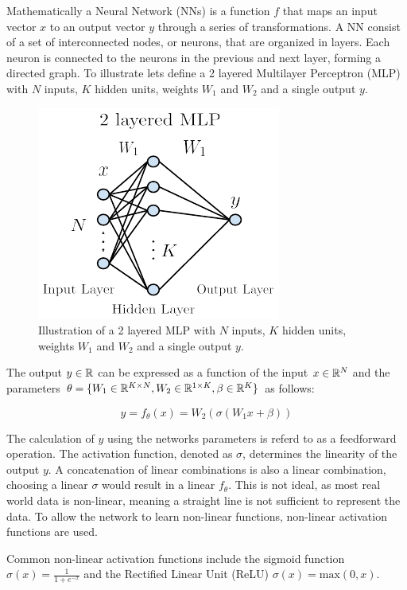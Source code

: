 Mathematically a Neural Network (NNs) is a function $f$ that maps an input vector $x$ to an output vector $y$ through a series of transformations. 
A NN consist of a set of interconnected nodes, or neurons, that are organized in layers. Each neuron is connected to the neurons in the previous and next layer, forming a directed graph.
To illustrate lets define a 2 layered Multilayer Perceptron (MLP) with $N$ inputs, $K$ hidden units, weights $W_1$ and $W_2$ and a single output $y$. 
\begin{figure}[H]
    \includegraphics[scale=1]{figures/figure-pdf/NN.pdf}
    \caption{Illustration of a 2 layered MLP with $N$ inputs, $K$ hidden units, weights $W_1$ and $W_2$ and a single output $y$.}
\end{figure}

The output $y \in \mathbb{R}$ can be expressed as a function of the input $x\in\mathbb{R}^N$ and the parameters $\theta=\{ W_1 \in \mathbb{R}^{K \times N}, W_2 \in \mathbb{R}^{1\times K}, \beta \in \mathbb{R}^K\}$ as follows:

\begin{equation}
    y = f_\theta(x) = W_2(\sigma(W_1 x + \beta))
\end{equation}

The calculation of $y$ using the networks parameters is referd to as a feedforward operation.
The activation function, denoted as $\sigma$, determines the linearity of the output $y$. 
A concatenation of linear combinations is also a linear combination, choosing a linear $\sigma$ would result in a linear $f_\theta$.
This is not ideal, as most real world data is non-linear, meaning a straight line is not sufficient to represent the data. 
To allow the network to learn non-linear functions, non-linear activation functions are used.

Common non-linear activation functions include the sigmoid function $\sigma(x) = \frac{1}{1+e^{-x}}$ and the Rectified Linear Unit (ReLU) $\sigma(x) = \text{max}(0, x)$. 

